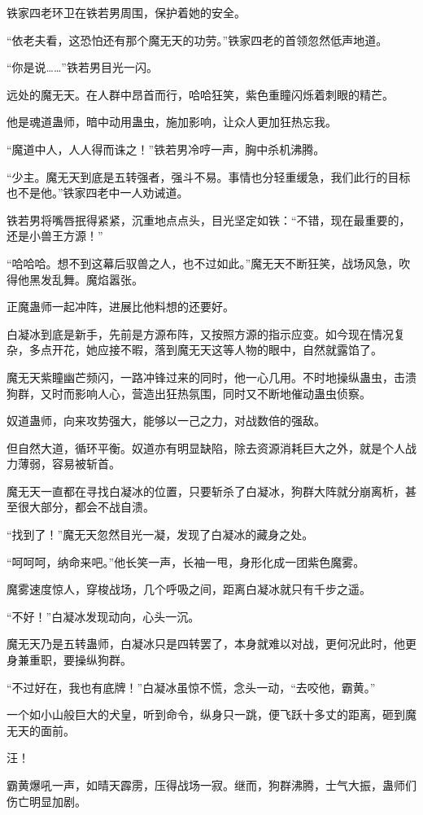 \begin{this_body}
铁家四老环卫在铁若男周围，保护着她的安全。

“依老夫看，这恐怕还有那个魔无天的功劳。”铁家四老的首领忽然低声地道。

“你是说……”铁若男目光一闪。

远处的魔无天。在人群中昂首而行，哈哈狂笑，紫色重瞳闪烁着刺眼的精芒。

他是魂道蛊师，暗中动用蛊虫，施加影响，让众人更加狂热忘我。

“魔道中人，人人得而诛之！”铁若男冷哼一声，胸中杀机沸腾。

“少主。魔无天到底是五转强者，强斗不易。事情也分轻重缓急，我们此行的目标也不是他。”铁家四老中一人劝诫道。

铁若男将嘴唇抿得紧紧，沉重地点点头，目光坚定如铁：“不错，现在最重要的，还是小兽王方源！”

“哈哈哈。想不到这幕后驭兽之人，也不过如此。”魔无天不断狂笑，战场风急，吹得他黑发乱舞。魔焰嚣张。

正魔蛊师一起冲阵，进展比他料想的还要好。

白凝冰到底是新手，先前是方源布阵，又按照方源的指示应变。如今现在情况复杂，多点开花，她应接不暇，落到魔无天这等人物的眼中，自然就露馅了。

魔无天紫瞳幽芒频闪，一路冲锋过来的同时，他一心几用。不时地操纵蛊虫，击溃狗群，又时而影响人心，营造出狂热氛围，同时又不断地催动蛊虫侦察。

奴道蛊师，向来攻势强大，能够以一己之力，对战数倍的强敌。

但自然大道，循环平衡。奴道亦有明显缺陷，除去资源消耗巨大之外，就是个人战力薄弱，容易被斩首。

魔无天一直都在寻找白凝冰的位置，只要斩杀了白凝冰，狗群大阵就分崩离析，甚至很大部分，都会不战自溃。

“找到了！”魔无天忽然目光一凝，发现了白凝冰的藏身之处。

“呵呵呵，纳命来吧。”他长笑一声，长袖一甩，身形化成一团紫色魔雾。

魔雾速度惊人，穿梭战场，几个呼吸之间，距离白凝冰就只有千步之遥。

“不好！”白凝冰发现动向，心头一沉。

魔无天乃是五转蛊师，白凝冰只是四转罢了，本身就难以对战，更何况此时，他更身兼重职，要操纵狗群。

“不过好在，我也有底牌！”白凝冰虽惊不慌，念头一动，“去咬他，霸黄。”

一个如小山般巨大的犬皇，听到命令，纵身只一跳，便飞跃十多丈的距离，砸到魔无天的面前。

汪！

霸黄爆吼一声，如晴天霹雳，压得战场一寂。继而，狗群沸腾，士气大振，蛊师们伤亡明显加剧。


\end{this_body}
